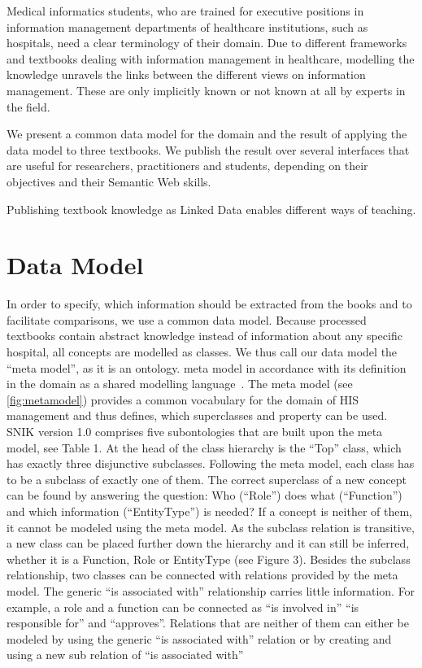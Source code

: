 \documentclass[sw]{iosart2x}
\renewcommand{\citep}{\cite}%
\newcommand{\snikversion}{1.0}
\begin{document}
Medical informatics students, who are trained for executive positions in information management departments of healthcare institutions, such as hospitals, need a clear terminology of their domain.
Due to different frameworks and textbooks dealing with information management in healthcare, modelling the knowledge unravels the links between the different views on information management.
These are only implicitly known or not known at all by experts in the field.

We present a common data model for the domain and the result of applying the data model to three textbooks.
We publish the result over several interfaces that are useful for researchers, practitioners and students, depending on their objectives and their Semantic Web skills.

Publishing textbook knowledge as Linked Data enables different ways of teaching.


\section{Data Model}
In order to specify, which information should be extracted from the books and to facilitate comparisons, we use a common data model.
Because processed textbooks contain abstract knowledge instead of information about any specific hospital, all concepts are modelled as classes.
We thus call our data model the \enquote{meta model}, as it is an ontology.
meta model in accordance with its definition in the domain as a shared modelling language~\citep[p.~8]{ob}.
The meta model (see \cref{fig:metamodel}) provides a common vocabulary for the domain of HIS management and thus defines, which superclasses and property can be used.
SNIK version \snikversion{} comprises five subontologies that are built upon the meta model, see Table 1.
At the head of the class hierarchy is the \enquote{Top} class, which has exactly three disjunctive subclasses.
Following the meta model, each class has to be a subclass of exactly one of them.
The correct superclass of a new concept can be found by answering the question: Who (\enquote{Role}) does what (\enquote{Function}) and which information (\enquote{EntityType}) is needed? If a concept is neither of them, it cannot be modeled using the meta model.
As the subclass relation is transitive, a new class can be placed further down the hierarchy and it can still be inferred, whether it is a Function, Role or EntityType (see Figure 3).
Besides the subclass relationship, two classes can be connected with relations provided by the meta model.
The generic \enquote{is associated with} relationship carries little information.
For example, a role and a function can be connected as \enquote{is involved in} \enquote{is responsible for} and \enquote{approves}.
Relations that are neither of them can either be modeled by using the generic \enquote{is associated with} relation or by creating and using a new sub relation of \enquote{is associated with}
\end{document}
